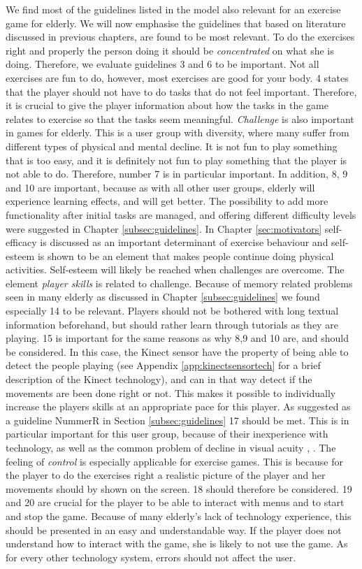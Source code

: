 We find most of the guidelines listed in the model also relevant for an exercise game for elderly. We will now emphasise the guidelines that based on literature discussed in previous chapters, are found to be most relevant. 
To do the exercises right and properly the person doing it should be \emph{concentrated} on what she is doing. Therefore, we evaluate guidelines 3 and 6 to be important. Not all exercises are fun to do, however, most exercises are good for your body. 4 states that the player should not have to do tasks that do not feel important. Therefore, it is crucial to give the player information about how the tasks in the game relates to exercise so that the tasks seem meaningful. \emph{Challenge} is also important in games for elderly. This is a user group with diversity, where many suffer from different types of physical and mental decline. It is not fun to play something that is too easy, and it is definitely not fun to play something that the player is not able to do. Therefore, number 7 is in particular important.  In addition, 8, 9 and 10 are important, because as with all other user groups, elderly will experience learning effects, and will get better. The possibility to add more functionality after initial tasks are managed, and offering different difficulty levels were suggested in Chapter \ref{subsec:guidelines}. In Chapter \ref{sec:motivators} self-efficacy is discussed as an important determinant of exercise behaviour and self-esteem is shown to be an element that makes people continue doing physical activities. Self-esteem will likely be reached when challenges are overcome.  The element \emph{player skills} is related to challenge. Because of memory related problems seen in many elderly as discussed in Chapter \ref{subsec:guidelines} we found especially 14 to be relevant. Players should not be bothered with long textual information beforehand, but should rather learn through tutorials as they are playing. 15 is important for the same reasons as why 8,9 and 10 are, and should be considered. In this case, the Kinect sensor have the property of being able to detect the people playing (see Appendix \ref{app:kinectsensortech} for a brief description of the Kinect technology), and can in that way detect if the movements are been done right or not. This makes it possible to individually increase the players skills at an appropriate pace for this player. As suggested as a guideline NummerR in Section \ref{subsec:guidelines} 17 should be met. This is in particular important for this user group, because of their inexperience with technology, as well as the common problem of decline in visual acuity \cite{Billis}, \cite{gregor}. The feeling of \emph{control} is especially applicable for exercise games. This is because for the player to do the exercises right a realistic picture of the player and her movements should by shown on the screen.  18 should therefore be considered. 19 and 20 are crucial for the player to be able to interact with menus and to start and stop the game. Because of many elderly's lack of technology experience, this should be presented in an easy and understandable way. If the player does not understand how to interact with the game, she is likely to not use the game. As for every other technology system, errors should not affect the user. 